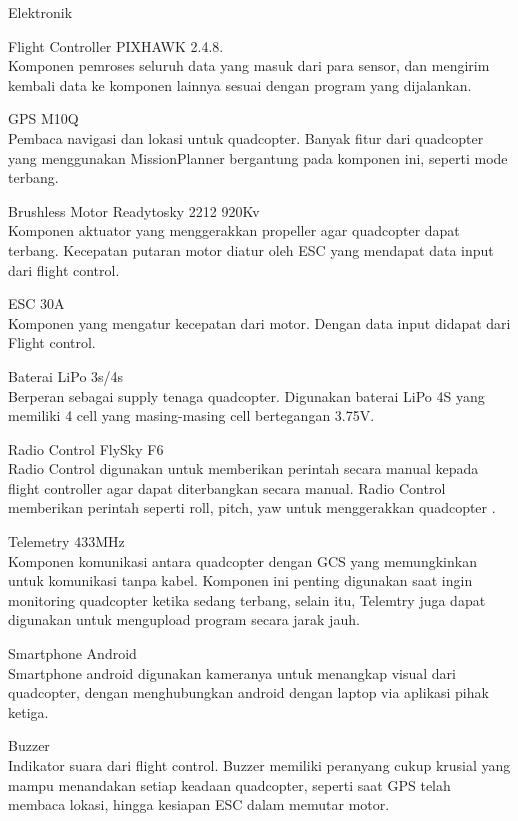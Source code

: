 \begin{packed_enum}
	\item Elektronik
	\begin{packed_item}
		\item [a.]Flight Controller PIXHAWK 2.4.8.
		\\ Komponen pemroses seluruh data yang masuk dari para sensor, dan mengirim kembali data ke komponen lainnya sesuai dengan program yang dijalankan.
		\item [b.]GPS M10Q
		\\ Pembaca navigasi dan lokasi untuk quadcopter. Banyak fitur dari quadcopter yang menggunakan MissionPlanner bergantung pada komponen ini, seperti mode terbang.
		\item [c.]Brushless Motor Readytosky 2212 920Kv
		\\ Komponen aktuator yang menggerakkan propeller agar quadcopter dapat terbang. Kecepatan putaran motor diatur oleh ESC yang mendapat data input dari flight control.
		\item [d.]ESC 30A
		\\ Komponen yang mengatur kecepatan dari motor. Dengan data input didapat dari Flight control.
		\item [e.]Baterai LiPo 3s/4s
		\\ Berperan sebagai supply tenaga quadcopter. Digunakan baterai LiPo 4S yang memiliki 4 cell yang masing-masing cell bertegangan 3.75V.
		\item [f.]Radio Control FlySky F6
		\\ Radio Control digunakan untuk memberikan perintah secara manual kepada flight controller agar dapat diterbangkan secara manual. Radio Control memberikan perintah seperti roll, pitch, yaw untuk menggerakkan quadcopter .
		\item [g.]Telemetry 433MHz
		\\ Komponen komunikasi antara quadcopter dengan GCS yang memungkinkan untuk komunikasi tanpa kabel. Komponen ini penting digunakan saat ingin monitoring quadcopter ketika sedang terbang, selain itu, Telemtry juga dapat digunakan untuk mengupload program secara jarak jauh.
		\item [h.]Smartphone Android
		\\ Smartphone android digunakan kameranya untuk menangkap visual dari quadcopter, dengan menghubungkan android dengan laptop via aplikasi pihak ketiga.
		\item [i.] Buzzer
		\\ Indikator suara dari flight control. Buzzer memiliki peranyang cukup krusial yang mampu menandakan setiap keadaan quadcopter, seperti saat GPS telah membaca lokasi, hingga kesiapan ESC dalam memutar motor.
	\end{packed_item}
\end{packed_enum}


